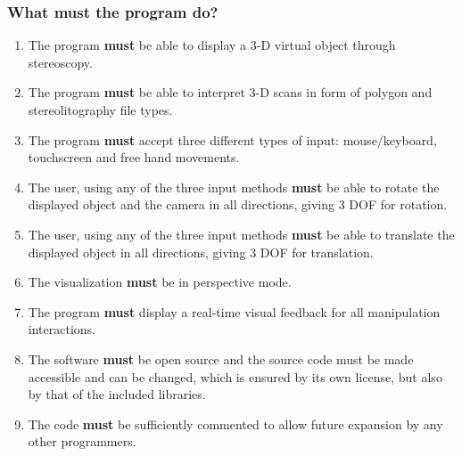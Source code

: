 \documentclass[12pt]{extarticle}
\begin{document}
\subsubsection{What must the program do?}
\begin{enumerate}
\item
The program \textbf{must} be able to display a 3-D virtual object through stereoscopy.
\item
The program \textbf{must} be able to interpret 3-D scans in form of polygon and stereolitography file types.
\item
The program \textbf{must} accept three different types of input: mouse/keyboard, touchscreen and free hand movements.
\item
The user, using any of the three input methods \textbf{must} be able to rotate the displayed object and the camera in all directions, giving 3 DOF for rotation.
\item
The user, using any of the three input methods \textbf{must} be able to translate the displayed object in all directions, giving 3 DOF for translation.
\item
The visualization \textbf{must} be in perspective mode.
\item
The program \textbf{must} display a real-time visual feedback for all manipulation interactions.
\item
The software \textbf{must} be open source and the source code must be made accessible and can be changed, which is ensured by its own license, but also by that of the included libraries.
\item
The code \textbf{must} be sufficiently commented to allow future expansion by any other programmers.
\end{enumerate}
\end{document}
